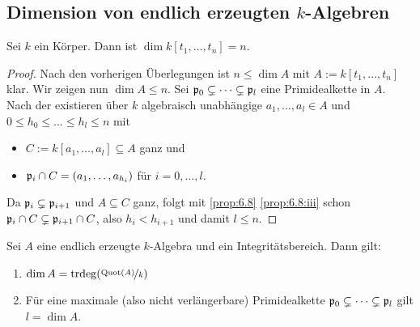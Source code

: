 \documentclass[12pt,a4paper]{scrartcl}
\theoremstyle{cplain}
\theoremstyle{cdef}
\begin{document}
\subsection{Dimension von endlich erzeugten $k$-Algebren}
\begin{lem} \label{lem:9.15}
	Sei $k$ ein Körper. Dann ist $\dim k[t_1,\dots, t_n] = n$.
\end{lem}
\begin{proof}
	Nach den vorherigen Überlegungen ist $n\le \dim A$ mit $A := k[t_1,\dots, t_n]$ klar. Wir zeigen nun $\dim A\le n$. Sei $\mathfrak{p}_0\subsetneq \dots \subsetneq \mathfrak{p}_l$ eine Primidealkette in $A$. Nach der  existieren über $k$ algebraisch unabhängige $a_1,\dots, a_l\in A$ und $0\le h_0\le \dots \le h_l\le n$ mit
	\begin{itemize}
		\item $C := k[a_1,\dots, a_l]\subseteq A$ ganz und
		\item $\mathfrak{p}_i\cap C= (a_1,\dots, a_{h_i})$ für $i = 0,\dots, l$.
	\end{itemize}
	Da $\mathfrak{p}_i\subsetneq\mathfrak{p}_{i+1}$ und $A\subseteq C$ ganz, folgt mit \cref{prop:6.8} \ref{prop:6.8:iii} schon $\mathfrak{p}_i\cap C\subsetneq \mathfrak{p}_{i+1}\cap C$, also $h_i<h_{i+1}$ und damit $ l\le n$.
\end{proof}
\begin{satz} \label{thm:9.16}
	Sei $A$ eine endlich erzeugte $k$-Algebra und ein Integritätsbereich. Dann gilt:
	\begin{enumerate}
		\item $\dim A = \operatorname{trdeg}(\nicefrac{\operatorname{Quot}(A)}{k})$ \label{thm:9.16:i}
		\item Für eine maximale (also nicht verlängerbare) Primidealkette $\mathfrak{p}_0\subsetneq\dots \subsetneq \mathfrak{p}_l$ gilt $l = \dim A$. \label{thm:9.16:ii}
	\end{enumerate}
\end{satz}
\end{document}
